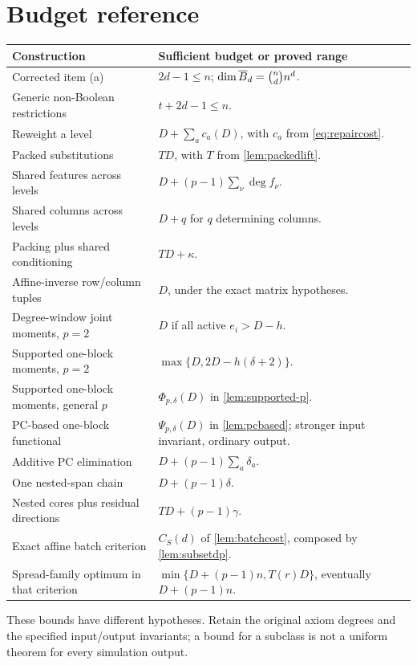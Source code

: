 \section{Budget reference}
\begingroup\small
\begin{longtable}{@{}L{0.36\textwidth}L{0.57\textwidth}@{}}
\toprule
Construction & Sufficient budget or proved range\\\midrule
\endhead
Corrected item (a) & $2d-1\le n$; $\dim\overline B_d=\binom ndn^d$.\\
Generic non-Boolean restrictions & $t+2d-1\le n$.\\
Reweight a level & $D+\sum_ac_a(D)$, with $c_a$ from \eqref{eq:repaircost}.\\
Packed substitutions & $TD$, with $T$ from \cref{lem:packedlift}.\\
Shared features across levels & $D+(p-1)\sum_\nu\deg f_\nu$.\\
Shared columns across levels & $D+q$ for $q$ determining columns.\\
Packing plus shared conditioning & $TD+\kappa$.\\
Affine-inverse row/column tuples & $D$, under the exact matrix hypotheses.\\
Degree-window joint moments, $p=2$ & $D$ if all active $e_i>D-h$.\\
Supported one-block moments, $p=2$ & $\max\{D,2D-h(\delta+2)\}$.\\
Supported one-block moments, general $p$ & $\Phi_{p,\delta}(D)$ in \cref{lem:supported-p}.\\
PC-based one-block functional & $\Psi_{p,\delta}(D)$ in \cref{lem:pcbased}; stronger input invariant, ordinary output.\\
Additive PC elimination & $D+(p-1)\sum_a\delta_a$.\\
One nested-span chain & $D+(p-1)\delta$.\\
Nested cores plus residual directions & $TD+(p-1)\gamma$.\\
Exact affine batch criterion & $C_S(d)$ of \cref{lem:batchcost}, composed by \cref{lem:subsetdp}.\\
Spread-family optimum in that criterion & $\min\{D+(p-1)n,T(r)D\}$, eventually $D+(p-1)n$.\\\bottomrule
\end{longtable}
\endgroup

These bounds have different hypotheses. Retain the original axiom degrees and the specified input/output invariants; a bound for a subclass is not a uniform theorem for every simulation output.
